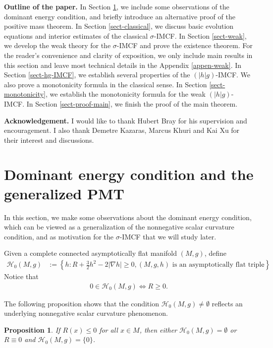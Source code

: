 \documentclass[11pt, letterpaper]{amsart}
\newtheorem{prop}[thm]{Proposition}
\theoremstyle{definition}
\theoremstyle{remark}
\begin{document}
\textbf{Outline of the paper.} In Section \ref{sect-DEC}, we include some observations of the dominant energy condition, and briefly introduce an alternative proof of the positive mass theorem. In Section \ref{sect-classical}, we discuss basic evolution equations and interior estimates of the classical  $\sigma $-IMCF. In Section \ref{sect-weak}, we develop the weak theory for the $\sigma $-IMCF and prove the existence theorem. For the reader’s convenience and clarity of exposition, we only include main results in this section and leave most technical details in the Appendix \ref{appen-weak}. In Section \ref{sect-hg-IMCF}, we establish several properties of the $(|h|g)$-IMCF. We also prove a monotonicity formula in the classical sense.  In Section \ref{sect-monotonicity}, we establish the monotonicity formula for the weak $(|h|g)$-IMCF. In Section \ref{sect-proof-main}, we finish the proof of the main theorem.


\textbf{Acknowledgement.}
I would like to thank Hubert Bray for his supervision and encouragement.
I also thank Demetre Kazaras, Marcus Khuri and Kai Xu for their interest and discussions.





\section{Dominant energy condition and the generalized PMT}\label{sect-DEC}
In this section, we make some observations about the dominant energy condition, which can be viewed as a generalization of the nonnegative scalar curvature condition, and as  motivation for the $\sigma $-IMCF that we will study later. 

Given a complete connected asymptotically flat manifold $(M,g)$, define
\begin{align*}
	\mathcal{H}_0(M,g) &:= \left\{ h : R + \frac{3}{2} h ^2 - 2 |\nabla h| \geq 0,  (M,g, h) \text{ is an asymptotically flat triple} \right\}.
\end{align*} 
Notice that 
\begin{align*}
	0 \in \mathcal{H}_0(M,g) \iff R \geq 0.
\end{align*}

The following proposition shows that the condition $\mathcal{H}_{0}(M,g) \neq \emptyset$ reflects an underlying nonnegative scalar curvature phenomenon.

\begin{prop}
	If $R(x) \leq  0$ for all $x \in M$, then either $\mathcal{H}_0(M,g) = \emptyset$ or $R \equiv 0$ and $\mathcal{H}_0(M,g) = \{0\} $.
\end{prop}
\end{document}
